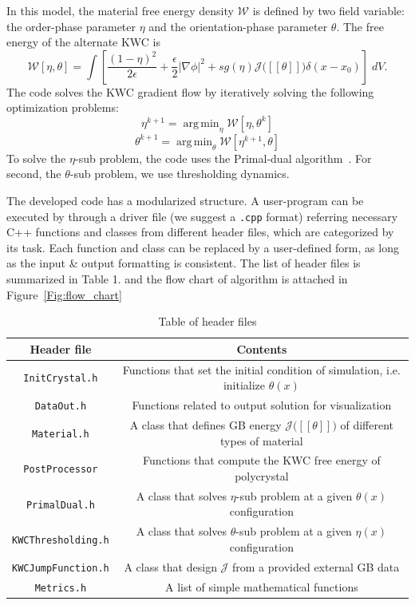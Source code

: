 \documentclass[11pt]{article}
\newcommand{\argmin}{\mathop{\mathrm{arg\,min}}}
\begin{document}
In this model, the material free energy density $\mathcal{W}$ 
is defined by two field variable: the order-phase parameter $\eta$ 
and the orientation-phase parameter $\theta$. 
The free energy of the alternate KWC is 
\begin{equation}
\mathcal{W}[\eta,\theta] = \int
\left[ \frac{(1-\eta)^2}{2 \epsilon} + \frac{\epsilon}{2}|\nabla \phi|^2
+sg(\eta) \mathcal{J}\big( [\![\theta ]\!]\big) \delta(x-x_0) 
\right]\; dV.
\label{eqn:alternateKWC}
\end{equation}
The code solves the KWC gradient flow 
by iteratively solving the following optimization problems:
\begin{equation}
\eta^{k+1}=\argmin_\eta \mathcal{W}[\eta, \theta^{k}] 
\end{equation}
\begin{equation}
\theta^{k+1}=\argmin_\theta  \mathcal{W}[\eta^{k+1}, \theta] 
\end{equation}
To solve the $\eta$-sub problem, 
the code uses the Primal-dual algorithm~\cite{Chambolle:2011,Jacobs:2019}.
For second, the $\theta$-sub problem, 
we use thresholding dynamics. 

The developed code has a modularized structure. 
A user-program can be executed by through a driver file 
(we suggest a \texttt{.cpp} format) 
referring necessary C++ functions and classes from different header files,
which are categorized by its task.
Each function and class can be replaced by a user-defined form, 
as long as the input \& output formatting is consistent. 
The list of header files is summarized in Table 1. 
and the flow chart of algorithm is attached in Figure~\ref{Fig:flow_chart}\\

\begin{table}[b]
\begin{center}
\begin{tabular}{cc} \toprule
Header file     & Contents \\ \midrule
\texttt{InitCrystal.h} & Functions that set the initial condition of simulation, i.e. initialize $\theta(x)$\\
\texttt{DataOut.h} & Functions related to output solution for visualization\\
\texttt{Material.h} & A class that defines GB energy $\mathcal{J}\big( [\![ \theta ]\!] \big)$ of different types of material \\
\texttt{PostProcessor} & Functions that compute the KWC free energy of polycrystal\\
\texttt{PrimalDual.h} & A class that solves $\eta$-sub problem at a given $\theta(x)$ configuration\\
\texttt{KWCThresholding.h} & A class that solves $\theta$-sub problem at a given $\eta(x)$ configuration\\
\texttt{KWCJumpFunction.h} & A class that design $\mathcal{J}$ from a provided external GB data \\
\texttt{Metrics.h} & A list of simple mathematical functions
\end{tabular}
\caption{Table of header files}
\label{tab:symbols}
\end{center}
\end{table}
\end{document}
